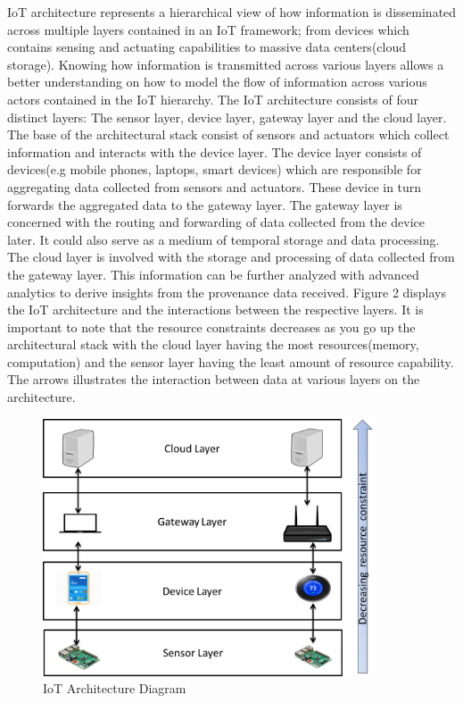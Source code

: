IoT architecture represents a hierarchical view of how information is disseminated across multiple layers contained in an IoT framework; from devices which contains sensing and actuating capabilities to massive data centers(cloud storage). Knowing how information is transmitted across various layers allows a better understanding on how to model the flow of information across various actors contained in the IoT hierarchy. The IoT architecture consists of four distinct layers: The sensor layer, device layer, gateway layer and the cloud layer. The base of the architectural stack consist of sensors and actuators which collect information and interacts with the device layer. The device layer consists of devices(e.g mobile phones, laptops, smart devices) which are responsible for aggregating data collected from sensors and actuators. These device in turn forwards the aggregated data to the gateway layer. The gateway layer is concerned with the routing and forwarding of data collected from the device later. It could also serve as a medium of temporal storage and data processing. The cloud layer is involved with the storage and processing of data collected from the gateway layer. This information can be further analyzed with advanced analytics to derive insights from the provenance data received.  Figure 2 displays the IoT architecture and the interactions between the respective  layers. It is important to note that the resource constraints decreases as you go up the architectural stack with the cloud layer having the most resources(memory, computation) and the sensor layer having the least amount of resource capability. The arrows illustrates the interaction between data at various layers on the architecture.


\begin{figure}[h]
\begin{center}

\includegraphics[height=3.0in]{iot_architecture.png}
\end{center}
\caption{IoT Architecture Diagram}

\end{figure}



